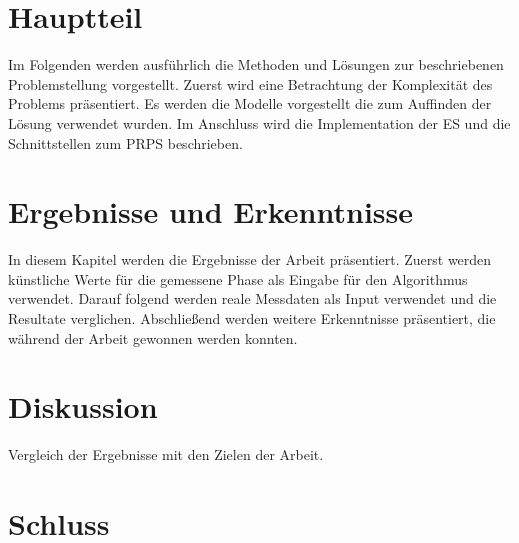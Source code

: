 \documentclass[a4paper,11pt, twoside, openright]{scrbook}
\begin{document}

%

\chapter{Hauptteil}
Im Folgenden werden ausführlich die Methoden und Lösungen zur beschriebenen Problemstellung vorgestellt. Zuerst wird eine Betrachtung der Komplexität des Problems präsentiert. Es werden die Modelle vorgestellt die zum Auffinden der Lösung verwendet wurden. Im Anschluss wird die Implementation der ES und die Schnittstellen zum PRPS beschrieben.
%

%
\chapter{Ergebnisse und Erkenntnisse}
In diesem Kapitel werden die Ergebnisse der Arbeit präsentiert. Zuerst werden künstliche Werte für die gemessene Phase als Eingabe für den Algorithmus verwendet. Darauf folgend werden reale Messdaten als Input verwendet und die Resultate verglichen. Abschließend werden weitere Erkenntnisse präsentiert, die während der Arbeit gewonnen werden konnten.\\
%

%
\chapter{Diskussion}
Vergleich der Ergebnisse mit den Zielen der Arbeit.\\
%
\lipsum[1-5]

%
\chapter{Schluss}
\lipsum[1-2]

%


\newpage

\nocite{*} %


\end{document}
